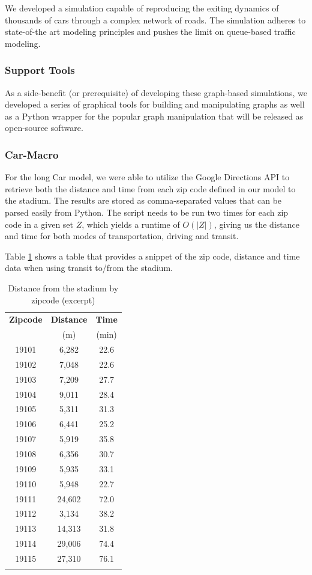 We developed a simulation capable of reproducing the exiting dynamics
of thousands of cars through a complex network of roads. The
simulation adheres to state-of-the art modeling principles and pushes
the limit on queue-based traffic modeling.

\subsubsection{Support Tools}
As a side-benefit (or prerequisite) of developing these graph-based
simulations, we developed a series of graphical tools for
building and manipulating graphs as well as a Python wrapper for the
popular graph manipulation that will be released as open-source software.

\subsubsection{Car-Macro}

For the long Car model, we were able to utilize the Google Directions
API to retrieve both the distance and time from each zip code defined
in our model to the stadium. The results are stored as comma-separated
values that can be parsed easily from Python. The script needs to be
run two times for each zip code in a given set $Z$, which yields a
runtime of $O(|Z|)$, giving us the distance and time for both modes of
transportation, driving and transit.

Table \ref{tab-zip-dists} shows a table that provides a snippet of the
zip code, distance and time data when using transit to/from the
stadium.

\begin{table}[htp]
  \centering
  \caption{Distance from the stadium by zipcode (excerpt)}
  \label{tab-zip-dists}
  \begin{tabular}{ccc}
    \firsthline
    \bfseries Zipcode & \bfseries Distance & \bfseries Time \\
    & (m) & (min) \\ \hline
    19101 & 6,282 & 22.6 \\
    19102 & 7,048 & 22.6 \\
    19103 & 7,209 & 27.7 \\
    19104 & 9,011 & 28.4 \\
    19105 & 5,311 & 31.3 \\
    19106 & 6,441 & 25.2 \\
    19107 & 5,919 & 35.8 \\
    19108 & 6,356 & 30.7 \\
    19109 & 5,935 & 33.1 \\
    19110 & 5,948 & 22.7 \\
    19111 & 24,602 & 72.0 \\
    19112 & 3,134 & 38.2 \\
    19113 & 14,313 & 31.8 \\
    19114 & 29,006 & 74.4 \\
    19115 & 27,310 & 76.1 \\
    \lasthline
  \end{tabular}
\end{table}

